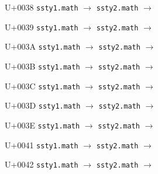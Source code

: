 \documentclass{article}
\begin{document}
\begin{substitutions}
\goodbreak

U+0038  \linebreak
    \texttt{ssty1.math} $\to$  \linebreak
    \texttt{ssty2.math} $\to$  

\goodbreak

U+0039  \linebreak
    \texttt{ssty1.math} $\to$  \linebreak
    \texttt{ssty2.math} $\to$  

\goodbreak

U+003A  \linebreak
    \texttt{ssty1.math} $\to$  \linebreak
    \texttt{ssty2.math} $\to$  

\goodbreak

U+003B  \linebreak
    \texttt{ssty1.math} $\to$  \linebreak
    \texttt{ssty2.math} $\to$  

\goodbreak

U+003C  \linebreak
    \texttt{ssty1.math} $\to$  \linebreak
    \texttt{ssty2.math} $\to$  

\goodbreak

U+003D  \linebreak
    \texttt{ssty1.math} $\to$  \linebreak
    \texttt{ssty2.math} $\to$  

\goodbreak

U+003E  \linebreak
    \texttt{ssty1.math} $\to$  \linebreak
    \texttt{ssty2.math} $\to$  

\goodbreak

U+0041  \linebreak
    \texttt{ssty1.math} $\to$  \linebreak
    \texttt{ssty2.math} $\to$  

\goodbreak

U+0042  \linebreak
    \texttt{ssty1.math} $\to$  \linebreak
    \texttt{ssty2.math} $\to$  


\end{substitutions}
\end{document}

